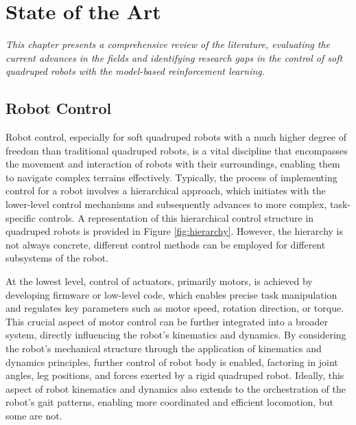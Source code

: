 \chapter{State of the Art}
\label{chap2}
\textit{This chapter presents a comprehensive review of the literature, evaluating the current advances in the fields and identifying research gaps in the control of soft quadruped robots with the model-based reinforcement learning.}

\section{Robot Control}
Robot control, especially for soft quadruped robots with a much higher degree of freedom than traditional quadruped robots, is a vital discipline that encompasses the movement and interaction of robots with their surroundings, enabling them to navigate complex terrains effectively\cite{biswalDevelopmentQuadrupedWalking2021}. Typically, the process of implementing control for a robot involves a hierarchical approach\cite{fazeliSeeFeelAct2019}, which initiates with the lower-level control mechanisms and subsequently advances to more complex, task-specific controls. A representation of this hierarchical control structure in quadruped robots is provided in Figure \ref{fig:hierarchy}. However, the hierarchy is not always concrete, different control methods can be employed for different subsystems of the robot.

At the lowest level, control of actuators, primarily motors, is achieved by developing firmware or low-level code\cite{yangMagneticActuationSystems2020}, which enables precise task manipulation and regulates key parameters such as motor speed, rotation direction, or torque. This crucial aspect of motor control can be further integrated into a broader system, directly influencing the robot's kinematics and dynamics\cite{dingNovelDynamicLocomotion2020}. By considering the robot's mechanical structure through the application of kinematics and dynamics principles, further control of robot body is enabled, factoring in joint angles, leg positions, and forces exerted by a rigid quadruped robot. Ideally, this aspect of robot kinematics and dynamics also extends to the orchestration of the robot's gait patterns, enabling more coordinated and efficient locomotion, but some are not\cite{dingNovelDynamicLocomotion2020}. 

